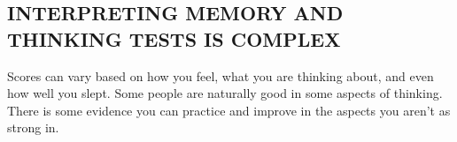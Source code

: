 \subsection{INTERPRETING MEMORY AND THINKING TESTS IS COMPLEX}

Scores can vary based on how you feel, what you are thinking about, and even how well you slept. Some people are naturally good in some aspects of thinking. There is some evidence you can practice and improve in the aspects you aren’t as strong in.